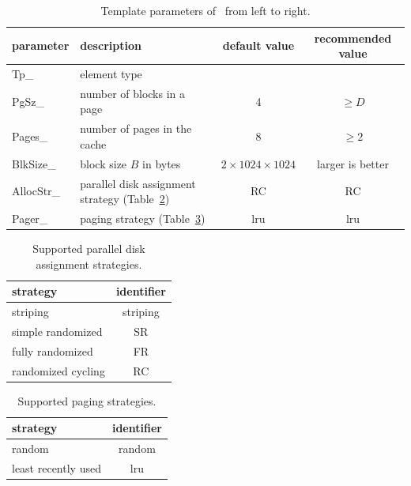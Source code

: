 \documentclass[twoside]{book}
\begin{document}
\begin{table}[h]
\begin{center}
\caption{Template parameters of \xvectorg\ from left to right.}
\label{vectorparam}
\begin{tabular}{|l|p{3.5cm}|c|c|}
\hline
parameter& description  & default value & recommended value \\
\hline\hline
Tp\_       & element type & & \\
\hline
PgSz\_     & number of blocks in a 
page
& 4 & $\geq D$\\
\hline
Pages\_    & number of pages in the cache & 8 & $\geq 2$ \\
\hline
BlkSize\_  & block size $B$ in bytes & $2\times 1024\times 1024$ & larger
is better\\
\hline
AllocStr\_ & parallel disk assignment strategy 
(Table~\ref{allocstr})
& RC & RC \\
\hline
Pager\_ & paging strategy 
(Table~\ref{pagingstr})
& lru & lru \\
\hline
\end{tabular}
\end{center}
\end{table}



\begin{table}[h]
\begin{center}
\caption{Supported parallel disk assignment strategies.}
\label{allocstr}
\begin{tabular}{|l|c|}
\hline
strategy & identifier  \\
\hline\hline
striping & striping \\
\hline
simple randomized & SR\\
\hline
fully randomized & FR\\
\hline
randomized cycling & RC \\
\hline
\end{tabular}
\end{center}
\end{table}

\begin{table}[h]
\begin{center}
\caption{Supported paging strategies.}
\label{pagingstr}
\begin{tabular}{|l|c|}
\hline
strategy & identifier  \\
\hline\hline
random & random \\
\hline
least recently used & lru\\
\hline
\end{tabular}
\end{center}
\end{table}
\end{document}
